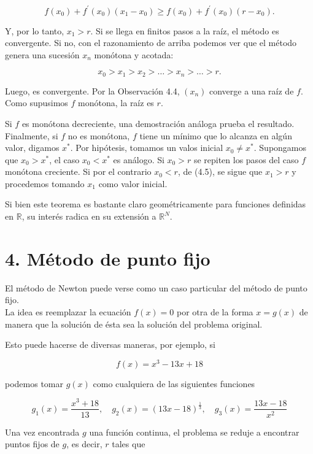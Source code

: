 \documentclass[10pt]{article}
\begin{document}
\begin{equation*}
f\left(x_{0}\right)+f^{\prime}\left(x_{0}\right)\left(x_{1}-x_{0}\right) \geq f\left(x_{0}\right)+f^{\prime}\left(x_{0}\right)\left(r-x_{0}\right) . \tag{4.5}
\end{equation*}


Y, por lo tanto, $x_{1}>r$. Si se llega en finitos pasos a la raíz, el método es convergente. Si no, con el razonamiento de arriba podemos ver que el método genera una sucesión $x_{n}$ monótona y acotada:

$$
x_{0}>x_{1}>x_{2}>\ldots>x_{n}>\ldots>r .
$$

Luego, es convergente. Por la Observación 4.4, $\left(x_{n}\right)$ converge a una raíz de $f$. Como supusimos $f$ monótona, la raíz es $r$.

Si $f$ es monótona decreciente, una demostración análoga prueba el resultado. Finalmente, si $f$ no es monótona, $f$ tiene un mínimo que lo alcanza en algún valor, digamos $x^{*}$. Por hipótesis, tomamos un valos inicial $x_{0} \neq x^{*}$. Supongamos que $x_{0}>x^{*}$, el caso $x_{0}<x^{*}$ es análogo. Si $x_{0}>r$ se repiten los pasos del caso $f$ monótona creciente. Si por el contrario $x_{0}<r$, de (4.5), se sigue que $x_{1}>r$ y procedemos tomando $x_{1}$ como valor inicial.

Si bien este teorema es bastante claro geométricamente para funciones definidas en $\mathbb{R}$, su interés radica en su extensión a $\mathbb{R}^{N}$.

\section*{4. Método de punto fijo}
El método de Newton puede verse como un caso particular del método de punto fijo.\\
La idea es reemplazar la ecuación $f(x)=0$ por otra de la forma $x=g(x)$ de manera que la solución de ésta sea la solución del problema original.

Esto puede hacerse de diversas maneras, por ejemplo, si

$$
f(x)=x^{3}-13 x+18
$$

podemos tomar $g(x)$ como cualquiera de las siguientes funciones

$$
g_{1}(x)=\frac{x^{3}+18}{13}, \quad g_{2}(x)=(13 x-18)^{\frac{1}{3}}, \quad g_{3}(x)=\frac{13 x-18}{x^{2}}
$$

Una vez encontrada $g$ una función continua, el problema se reduje a encontrar puntos fijos de $g$, es decir, $r$ tales que
\end{document}
